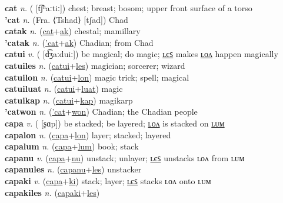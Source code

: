 \textbf{cat} \textit{n.} ( [t͡ʃʰaːtiː])
chest; breast; bosom; upper front surface of a torso \label{cat} \\
\textbf{'cat} \textit{n.} (Fra. ⟨Tshad⟩ [tʃad])
Chad \label{'cat} \\
\textbf{catak} \textit{n.} (\hyperref[cat]{cat}+\hyperref[ak]{ak})
chestal; mamillary \label{catak} \\
\textbf{'catak} \textit{n.} (\hyperref['cat]{'cat}+\hyperref[ak]{ak})
Chadian; from Chad \label{'catak} \\
\textbf{catui} \textit{v.} ( [d͡ʒaːduiː])
be magical; do magic; \hyperref[catuiles]{ʟєꜱ} makes \hyperref[catuilon]{ʟᴏᴧ} happen magically \label{catui} \\
\textbf{catuiles} \textit{n.} (\hyperref[catui]{catui}+\hyperref[les]{les})
magician; sorcerer; wizard \label{catuiles} \\
\textbf{catuilon} \textit{n.} (\hyperref[catui]{catui}+\hyperref[lon]{lon})
magic trick; spell; magical \label{catuilon} \\
\textbf{catuiluat} \textit{n.} (\hyperref[catui]{catui}+\hyperref[luat]{luat})
magic \label{catuiluat} \\
\textbf{catuikap} \textit{n.} (\hyperref[catui]{catui}+\hyperref[kap]{kap})
magikarp \label{catuikap} \\
\textbf{'catwon} \textit{n.} (\hyperref['cat]{'cat}+\hyperref[won]{won})
Chadian; the Chadian people \label{'catwon} \\
\textbf{capa} \textit{v.} ( [ʂɑp])
be stacked; be layered; \hyperref[capalon]{ʟᴏᴧ} is stacked on \hyperref[capalum]{ʟᴜᴍ} \label{capa} \\
\textbf{capalon} \textit{n.} (\hyperref[capa]{capa}+\hyperref[lon]{lon})
layer; stacked; layered \label{capalon} \\
\textbf{capalum} \textit{n.} (\hyperref[capa]{capa}+\hyperref[lum]{lum})
book; stack \label{capalum} \\
\textbf{capanu} \textit{v.} (\hyperref[capa]{capa}+\hyperref[nu]{nu})
unstack; unlayer; \hyperref[capanules]{ʟєꜱ} unstacks ʟᴏᴧ from ʟᴜᴍ \label{capanu} \\
\textbf{capanules} \textit{n.} (\hyperref[capanu]{capanu}+\hyperref[les]{les})
unstacker \label{capanules} \\
\textbf{capaki} \textit{v.} (\hyperref[capa]{capa}+\hyperref[ki]{ki})
stack; layer; \hyperref[capakiles]{ʟєꜱ} stacks ʟᴏᴧ onto ʟᴜᴍ \label{capaki} \\
\textbf{capakiles} \textit{n.} (\hyperref[capaki]{capaki}+\hyperref[les]{les})
